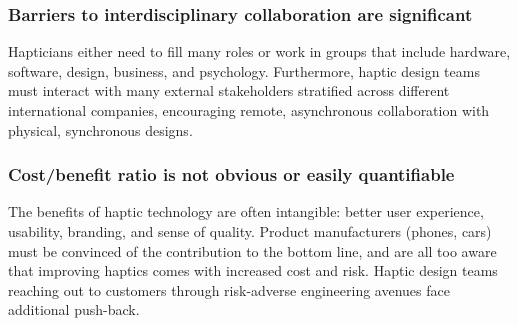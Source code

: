     \subsubsection{Barriers to interdisciplinary collaboration are significant}    
    \noindent
    Hapticians either need to fill many roles or work in groups that include hardware, software, design, business, and psychology.
    Furthermore, haptic design teams must interact with many external stakeholders stratified across different international companies, encouraging remote, asynchronous collaboration with physical, synchronous designs.
    
    
    \subsubsection{Cost/benefit ratio is not obvious or easily quantifiable}    
    \noindent
    The benefits of haptic technology are often intangible: better user experience, usability, branding, and sense of quality.
    Product manufacturers (phones, cars) must be convinced of the contribution to the bottom line, and %
    are all too aware that improving haptics comes with increased cost and risk.
    Haptic design teams reaching out to customers through risk-adverse engineering avenues face additional push-back. %
    
